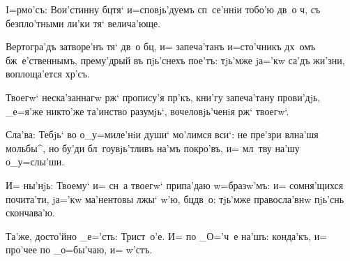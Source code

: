 I=рмо'съ: Вои'стинну бц тя` и=сповjь'дуемъ 
сп~се'ннiи тобо'ю дв~о ч, съ безпло'тными ли'ки тя` 
велича'юще.

Вертогра'дъ затворе'нъ тя` дв~о бц, и= запеча'танъ 
и=сто'чникъ дх~омъ бж~е'ственнымъ, прему'дрый въ 
пjь'снехъ пое'тъ: тjь'мже jа='кw са'дъ жи'зни, 
воплоща'ется хр'съ.

Твоегw` неска'заннагw рж` пропису'я пр'къ, 
кни'гу запеча'тану прови'дjь, _е=я'же никто'же та'инство 
разумjь`, вочеловjь'ченiя рж` твоегw`.

Сла'ва: Тебjь` во о_у=миле'нiи души` мо'лимся вси`: не 
пре'зри вл на'шя мольбы^, но бу'ди бл~гоувjь'тливъ 
на'мъ покро'въ, и= мл~тву на'шу о_у=слы'ши.

И= ны'нjь: Твоему` и= сн~а твоегw` припа'даю 
w=бразw'мъ: и= сомня'щихся почита'ти, jа='кw ма'нентовы 
лжы` w'ю, бц дв~о: тjь'мже правосла'внw пjь'снь 
скончава'ю.

Та'же, досто'йно _е='сть: Трист~о'е. И= по _О='ч~е 
на'шъ: конда'къ, и= про'чее по _о=бы'чаю, и= w'стъ.
